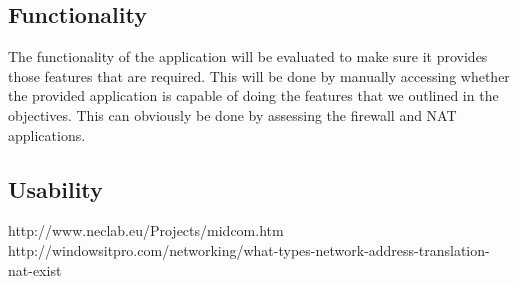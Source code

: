 \documentclass[a4paper, titlepage]{article}
\begin{document}
\subsection{Functionality}
The functionality of the application will be evaluated to make sure it provides those features that are required. This will be done by manually accessing whether the provided application is capable of doing the features that we outlined in the objectives. This can obviously be done by assessing the firewall and NAT applications.

\subsection{Usability}

\newpage


\begin{thebibliography}{99}
http://www.neclab.eu/Projects/midcom.htm \\
http://windowsitpro.com/networking/what-types-network-address-translation-nat-exist \\
\end{thebibliography}
\end{document}
